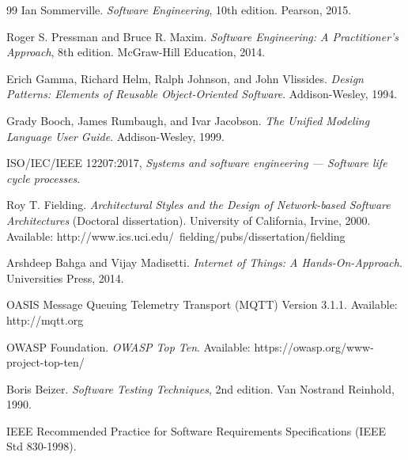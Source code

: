\newpage
\renewcommand{\refname}{Tài liệu tham khảo}
\renewcommand{\bibname}{Tài liệu tham khảo}
\begin{thebibliography}{99}
Ian Sommerville. \textit{Software Engineering}, 10th edition. Pearson, 2015.

Roger S. Pressman and Bruce R. Maxim. \textit{Software Engineering: A Practitioner's Approach}, 8th edition. McGraw-Hill Education, 2014.

Erich Gamma, Richard Helm, Ralph Johnson, and John Vlissides. \textit{Design Patterns: Elements of Reusable Object-Oriented Software}. Addison-Wesley, 1994.

Grady Booch, James Rumbaugh, and Ivar Jacobson. \textit{The Unified Modeling Language User Guide}. Addison-Wesley, 1999.

ISO/IEC/IEEE 12207:2017, \textit{Systems and software engineering — Software life cycle processes}.

Roy T. Fielding. \textit{Architectural Styles and the Design of Network-based Software Architectures} (Doctoral dissertation). University of California, Irvine, 2000. Available: http://www.ics.uci.edu/~fielding/pubs/dissertation/fielding

Arshdeep Bahga and Vijay Madisetti. \textit{Internet of Things: A Hands-On-Approach}. Universities Press, 2014.

OASIS Message Queuing Telemetry Transport (MQTT) Version 3.1.1. Available: http://mqtt.org

OWASP Foundation. \textit{OWASP Top Ten}. Available: https://owasp.org/www-project-top-ten/

Boris Beizer. \textit{Software Testing Techniques}, 2nd edition. Van Nostrand Reinhold, 1990.

IEEE Recommended Practice for Software Requirements Specifications (IEEE Std 830-1998).

\end{thebibliography}

